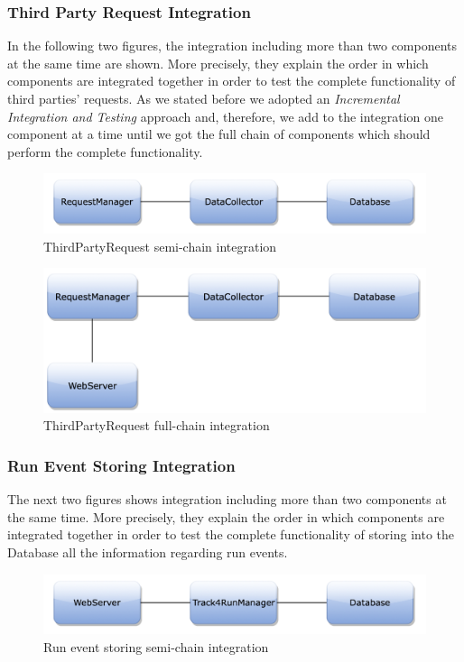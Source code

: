 \newpage
\subsubsection{Third Party Request Integration}
In the following two figures, the integration including more than two components at the same time are shown. More precisely, they explain the order in which components are integrated together in order to test the complete functionality of third parties' requests. As we stated before we adopted  an \textit{Incremental Integration and Testing} approach and, therefore, we add to the integration one component at a time until we got the full chain of components which should perform the complete functionality.
\begin{figure}[H]
\centering
\includegraphics[scale=0.65]{Images/IntegrationPlanImages/fig15.png}
\caption{ThirdPartyRequest semi-chain integration}
\end{figure}

\begin{figure}[H]
\centering
\includegraphics[scale=0.35]{Images/IntegrationPlanImages/fig16.png}
\caption{ThirdPartyRequest full-chain integration}
\end{figure}

\subsubsection{Run Event Storing Integration}
The next two figures shows integration including more than two components at the same time. More precisely, they explain the order in which components are integrated together in order to test the complete functionality of storing into the Database all the information regarding run events. 
\begin{figure}[H]
\centering
\includegraphics[scale=0.65]{Images/IntegrationPlanImages/fig17.png}
\caption{Run event storing semi-chain integration}
\end{figure}


